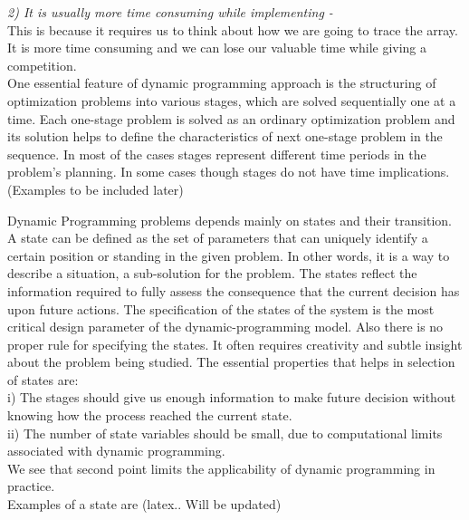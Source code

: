 \documentclass[12pt]{book}
\begin{document}
\textit{2)  It is usually more time consuming while implementing -}\\This is because it requires us to think about how we are going to trace the array. It is more time consuming and we can lose our valuable time while giving a competition.\\
	
		One essential feature of dynamic programming approach is the structuring of optimization problems into various stages, which are solved sequentially one at a time. Each one-stage problem is solved as an ordinary optimization problem and its solution helps to define the characteristics of next one-stage problem in the sequence. In most of the cases stages represent different time periods in the problem’s planning. In some cases though stages do not have time implications. (Examples to be included later)
		
	
		Dynamic Programming problems depends mainly on states and their transition. A state can be defined as the set of parameters that can uniquely identify a certain position or standing in the given problem. In other words, it is a way to describe a situation, a sub-solution for the problem. The states reflect the information required to fully assess the consequence that the current decision has upon future actions. The specification of the states of the system is the most critical design parameter of the dynamic-programming model. Also there is no proper rule for specifying the states. It often requires creativity and subtle insight about the problem being studied. The essential properties that helps in selection of states are:\\

	i) The stages should give us enough information to make future decision without knowing how the process reached the current state.\\

	ii) The number of state variables should be small, due to computational limits associated with dynamic programming.\\

We see that second point limits the applicability of dynamic programming in practice.\\
Examples of a state are (latex.. Will be updated)
\end{document}
